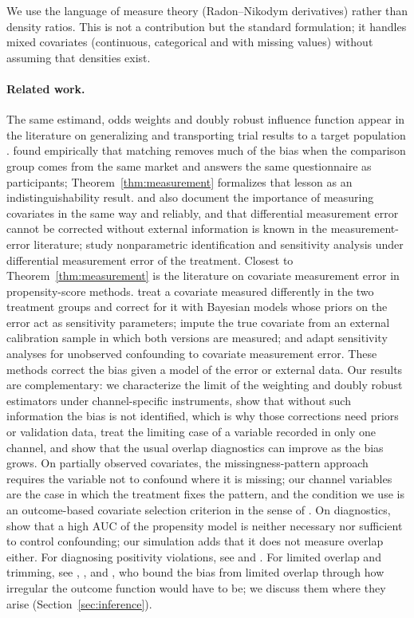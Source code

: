 We use the language of measure theory (Radon--Nikodym derivatives) rather than density ratios. This is not a contribution but the standard formulation; it handles mixed covariates (continuous, categorical and with missing values) without assuming that densities exist.

\paragraph{Related work.} The same estimand, odds weights and doubly robust influence function appear in the literature on generalizing and transporting trial results to a target population \citep{westreich2017,dahabreh2019}. \citet{heckman1997} found empirically that matching removes much of the bias when the comparison group comes from the same market and answers the same questionnaire as participants; Theorem~\ref{thm:measurement} formalizes that lesson as an indistinguishability result. \citet{cook2008} and \citet{steiner2011} also document the importance of measuring covariates in the same way and reliably, and that differential measurement error cannot be corrected without external information is known in the measurement-error literature; \citet{imai2010} study nonparametric identification and sensitivity analysis under differential measurement error of the treatment. Closest to Theorem~\ref{thm:measurement} is the literature on covariate measurement error in propensity-score methods. \citet{hong2017} treat a covariate measured differently in the two treatment groups and correct for it with Bayesian models whose priors on the error act as sensitivity parameters; \citet{webbvargas2017} impute the true covariate from an external calibration sample in which both versions are measured; and \citet{rudolph2016} adapt sensitivity analyses for unobserved confounding to covariate measurement error. These methods correct the bias given a model of the error or external data. Our results are complementary: we characterize the limit of the weighting and doubly robust estimators under channel-specific instruments, show that without such information the bias is not identified, which is why those corrections need priors or validation data, treat the limiting case of a variable recorded in only one channel, and show that the usual overlap diagnostics can improve as the bias grows. On partially observed covariates, the missingness-pattern approach \citep{dagostino2000,blake2020} requires the variable not to confound where it is missing; our channel variables are the case in which the treatment fixes the pattern, and the condition we use is an outcome-based covariate selection criterion in the sense of \citet{deluna2011}. On diagnostics, \citet{westreich2011} show that a high AUC of the propensity model is neither necessary nor sufficient to control confounding; our simulation adds that it does not measure overlap either. For diagnosing positivity violations, see \citet{petersen2012} and \citet{damour2021}. For limited overlap and trimming, see \citet{crump2009}, \citet{ma2020,ma2023}, \citet{liu2023} and \citet{manamkoong2025}, who bound the bias from limited overlap through how irregular the outcome function would have to be; we discuss them where they arise (Section~\ref{sec:inference}).
